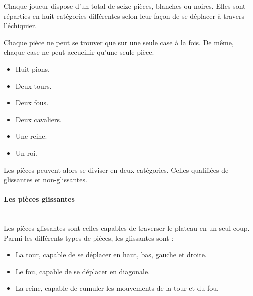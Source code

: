 \huge\documentclass{article}
\begin{document}
    Chaque joueur dispose d'un total de seize pièces, blanches ou noires. Elles sont réparties en huit catégories différentes selon leur façon de se déplacer à travers l'échiquier.

    Chaque pièce ne peut se trouver que sur une seule case à la fois. De même, chaque case ne peut accueillir qu'une seule pièce.

    \begin{itemize}
        \item Huit pions.
        \item Deux tours.
        \item Deux fous.
        \item Deux cavaliers.
        \item Une reine.
        \item Un roi.
    \end{itemize}

    Les pièces peuvent alors se diviser en deux catégories. Celles qualifiées de glissantes et non-glissantes.

    \paragraph{Les pièces glissantes}
    ~~\\

    Les pièces glissantes sont celles capables de traverser le plateau en un seul coup. Parmi les différents types de pièces, les glissantes sont :

    \begin{itemize}
        \item La tour, capable de se déplacer en haut, bas, gauche et droite.
        \item Le fou, capable de se déplacer en diagonale.
        \item La reine, capable de cumuler les mouvements de la tour et du fou.
    \end{itemize}
\end{document}
